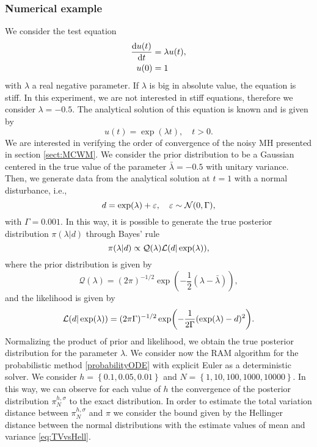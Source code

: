 \subsubsection{Numerical example}

We consider the test equation
\begin{equation}
\begin{aligned}
	\dv{u(t)}{t} &= \lambda u(t), \\
	u(0) &= 1
\end{aligned}
\end{equation}
with $\lambda$ a real negative parameter. If $\lambda$ is big in absolute value, the equation is stiff. In this experiment, we are not interested in stiff equations, therefore we consider $\lambda = -0.5$. The analytical solution of this equation is known and is given by
\begin{equation}
	u(t) = \exp(\lambda t), \quad t > 0.
\end{equation}
We are interested in verifying the order of convergence of the noisy MH presented in section \ref{sect:MCWM}. We consider the prior distribution to be a Gaussian centered in the true value of the parameter $\bar \lambda = -0.5$ with unitary variance. Then, we generate data from the analytical solution at $t = 1$ with a normal disturbance, i.e.,
\begin{equation}
	d = \exp(\lambda) + \varepsilon, \quad \varepsilon \sim \mathcal{N}(0, \Gamma),
\end{equation}
with $\Gamma = 0.001$. In this way, it is possible to generate the true posterior distribution $\pi(\lambda|d)$ through Bayes' rule
\begin{equation}
	\pi(\lambda|d) \propto \mathcal{Q}(\lambda) \mathcal{L}(d|\exp(\lambda)),
\end{equation}
where the prior distribution is given by
\begin{equation}
	\mathcal{Q}(\lambda) = (2\pi)^{-1/2}\exp(-\frac{1}{2}(\lambda - \bar\lambda)),
\end{equation}
and the likelihood is given by
\begin{equation}
	\mathcal{L}(d|\exp(\lambda)) = (2\pi\Gamma)^{-1/2}\exp(-\frac{1}{2\Gamma}(\exp(\lambda) - d)^2).
\end{equation}
Normalizing the product of prior and likelihood, we obtain the true posterior distribution for the parameter $\lambda$. We consider now the RAM algorithm for the probabilistic method \eqref{probabilityODE} with explicit Euler as a deterministic solver. We consider $h = \left\{0.1, 0.05, 0.01\right\}$ and $N = \left\{1, 10, 100, 1000, 10000\right\}$. In this way, we can observe for each value of $h$ the convergence of the posterior distribution $\pi^{h,\sigma}_N$ to the exact distribution. In order to estimate the total variation distance between $\pi^{h,\sigma}_N$ and $\pi$ we consider the bound given by the Hellinger distance between the normal distributions with the estimate values of mean and variance \eqref{eq:TVvsHell}.

